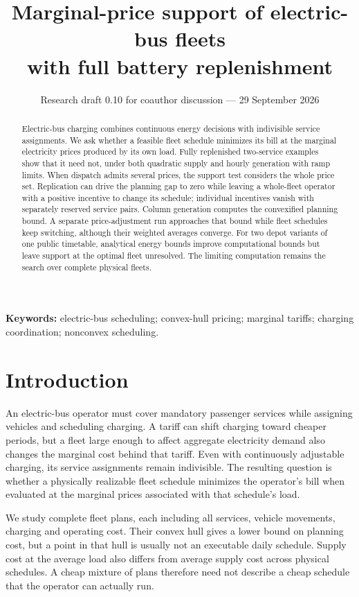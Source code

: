 \documentclass[11pt]{article}
\title{Marginal-price support of electric-bus fleets\\with full battery replenishment}
\author{}
\date{Research draft 0.10 for coauthor discussion --- 29 September 2026}
\let\originalsection\section
\renewcommand{\section}{\FloatBarrier\originalsection}
\begin{document}
\maketitle
\begin{abstract}
Electric-bus charging combines continuous energy decisions with indivisible service assignments. We ask whether a feasible fleet schedule minimizes its bill at the marginal electricity prices produced by its own load. Fully replenished two-service examples show that it need not, under both quadratic supply and hourly generation with ramp limits. When dispatch admits several prices, the support test considers the whole price set. Replication can drive the planning gap to zero while leaving a whole-fleet operator with a positive incentive to change its schedule; individual incentives vanish with separately reserved service pairs. Column generation computes the convexified planning bound. A separate price-adjustment run approaches that bound while fleet schedules keep switching, although their weighted averages converge. For two depot variants of one public timetable, analytical energy bounds improve computational bounds but leave support at the optimal fleet unresolved. The limiting computation remains the search over complete physical fleets.
\end{abstract}
\noindent\textbf{Keywords:} electric-bus scheduling; convex-hull pricing; marginal tariffs; charging coordination; nonconvex scheduling.

\section{Introduction}
An electric-bus operator must cover mandatory passenger services while assigning vehicles and scheduling charging. A tariff can shift charging toward cheaper periods, but a fleet large enough to affect aggregate electricity demand also changes the marginal cost behind that tariff. Even with continuously adjustable charging, its service assignments remain indivisible. The resulting question is whether a physically realizable fleet schedule minimizes the operator's bill when evaluated at the marginal prices associated with that schedule's load.

We study complete fleet plans, each including all services, vehicle movements, charging and operating cost. Their convex hull gives a lower bound on planning cost, but a point in that hull is usually not an executable daily schedule. Supply cost at the average load also differs from average supply cost across physical schedules. A cheap mixture of plans therefore need not describe a cheap schedule that the operator can actually run.
\end{document}
